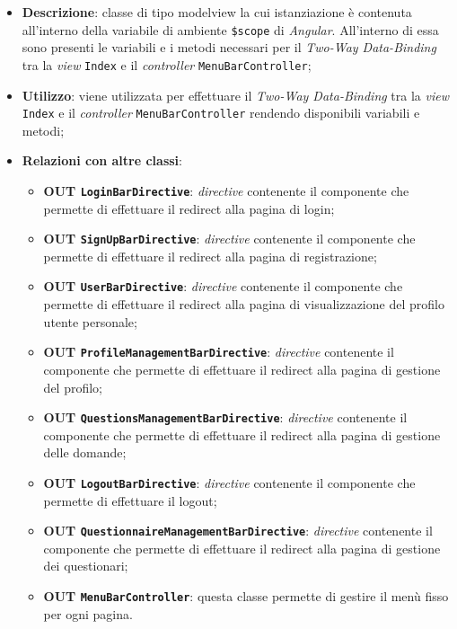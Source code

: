 \begin{itemize}
	\item \textbf{Descrizione}: classe di tipo modelview la cui istanziazione è contenuta all'interno della variabile di ambiente \texttt{\$scope} di \textit{Angular}. All'interno di essa sono presenti le variabili e i metodi necessari per il \textit{Two-Way Data-Binding} tra la \textit{view} \texttt{Index} e il \textit{controller} \texttt{MenuBarController};
	\item \textbf{Utilizzo}: viene utilizzata per effettuare il \textit{Two-Way Data-Binding} tra la \textit{view} \texttt{Index} e il \textit{controller} \texttt{MenuBarController} rendendo disponibili variabili e metodi;
	\item \textbf{Relazioni con altre classi}: 
	\begin{itemize}
		\item \textbf{OUT \texttt{LoginBarDirective}}: \textit{directive} contenente il componente che permette di effettuare il redirect alla pagina di login;
		\item \textbf{OUT \texttt{SignUpBarDirective}}: \textit{directive} contenente il componente che permette di effettuare il redirect alla pagina di registrazione;
		\item \textbf{OUT \texttt{UserBarDirective}}: \textit{directive} contenente il componente che permette di effettuare il redirect alla pagina di visualizzazione del profilo utente personale;
		\item \textbf{OUT \texttt{ProfileManagementBarDirective}}: \textit{directive} contenente il componente che permette di effettuare il redirect alla pagina di gestione del profilo;
		\item \textbf{OUT \texttt{QuestionsManagementBarDirective}}: \textit{directive} contenente il componente che permette di effettuare il redirect alla pagina di gestione delle domande;
		\item \textbf{OUT \texttt{LogoutBarDirective}}: \textit{directive} contenente il componente che permette di effettuare il logout;
		\item \textbf{OUT \texttt{QuestionnaireManagementBarDirective}}: \textit{directive} contenente il componente che permette di effettuare il redirect alla pagina di gestione dei questionari;
		\item \textbf{OUT \texttt{MenuBarController}}: questa classe permette di gestire il menù fisso per ogni pagina.
	\end{itemize}

\end{itemize}
